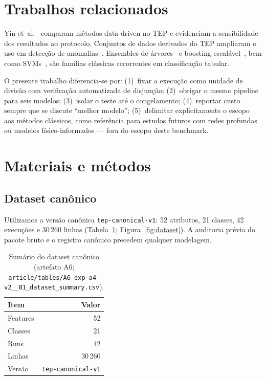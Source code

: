 \documentclass[11pt,a4paper]{article}
\begin{document}
\section{Trabalhos relacionados}
\label{sec:related}

Yin et~al.~\cite{yin2012tep} comparam métodos data-driven no TEP e evidenciam a
sensibilidade dos resultados ao protocolo. Conjuntos de dados derivados do TEP
ampliaram o uso em detecção de anomalias~\cite{rieth2017tep}. Ensembles de
árvores~\cite{breiman2001rf} e boosting escalável~\cite{chen2016xgboost}, bem
como SVMs~\cite{cortes1995svm}, são famílias clássicas recorrentes em
classificação tabular.

O presente trabalho diferencia-se por: (1)~fixar a execução como unidade de
divisão com verificação automatizada de disjunção; (2)~obrigar o mesmo pipeline
para seis modelos; (3)~isolar o teste até o congelamento; (4)~reportar custo
sempre que se discute ``melhor modelo''; (5)~delimitar explicitamente o escopo
aos métodos clássicos, como referência para estudos futuros com redes profundas
ou modelos físico-informados --- fora do escopo deste benchmark.

\section{Materiais e métodos}
\label{sec:metodos}

\subsection{Dataset canônico}

Utilizamos a versão canônica \texttt{tep-canonical-v1}: 52 atributos, 21
classes, 42 execuções e 30\,260 linhas (Tabela~\ref{tab:dataset};
Figura~\ref{fig:dataset}). A auditoria prévia do pacote bruto e o registro
canônico precedem qualquer modelagem.

\begin{table}[ht]
\centering
\caption{Sumário do dataset canônico (artefato A6;
\texttt{article/tables/A6\_exp-a4-v2\_\_01\_dataset\_summary.csv}).}
\label{tab:dataset}
\begin{tabular}{lr}
\toprule
Item & Valor \\
\midrule
Features & 52 \\
Classes & 21 \\
Runs & 42 \\
Linhas & 30\,260 \\
Versão & \texttt{tep-canonical-v1} \\
\bottomrule
\end{tabular}
\end{table}
\end{document}

